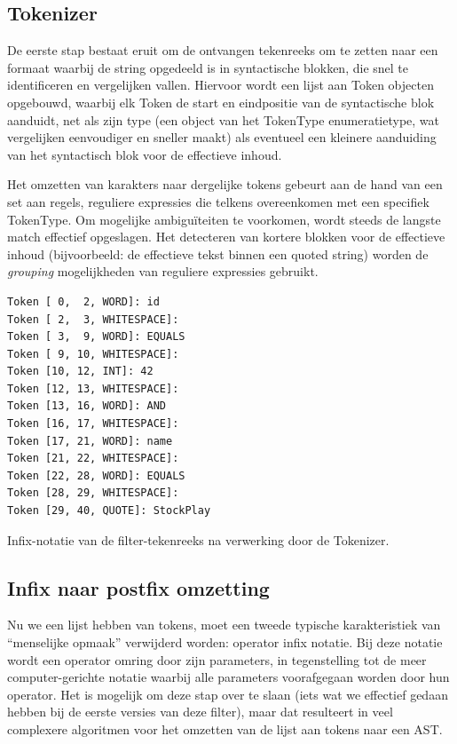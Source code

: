 \subsection{Tokenizer}

De eerste stap bestaat eruit om de ontvangen tekenreeks om te zetten naar een formaat waarbij de string opgedeeld is in syntactische blokken, die snel te identificeren en vergelijken vallen. Hiervoor wordt een lijst aan Token objecten opgebouwd, waarbij elk Token de start en eindpositie van de syntactische blok aanduidt, net als zijn type (een object van het TokenType enumeratietype, wat vergelijken eenvoudiger en sneller maakt) als eventueel een kleinere aanduiding van het syntactisch blok voor de effectieve inhoud.

Het omzetten van karakters naar dergelijke tokens gebeurt aan de hand van een set aan regels, reguliere expressies die telkens overeenkomen met een specifiek TokenType. Om mogelijke ambigu\"iteiten te voorkomen, wordt steeds de langste match effectief opgeslagen. Het detecteren van kortere blokken voor de effectieve inhoud (bijvoorbeeld: de effectieve tekst binnen een quoted string) worden de \emph{grouping} mogelijkheden van reguliere expressies gebruikt.

\begin{code}
\begin{verbatim}
Token [ 0,  2, WORD]: id
Token [ 2,  3, WHITESPACE]:  
Token [ 3,  9, WORD]: EQUALS
Token [ 9, 10, WHITESPACE]:  
Token [10, 12, INT]: 42
Token [12, 13, WHITESPACE]:  
Token [13, 16, WORD]: AND
Token [16, 17, WHITESPACE]:  
Token [17, 21, WORD]: name
Token [21, 22, WHITESPACE]:  
Token [22, 28, WORD]: EQUALS
Token [28, 29, WHITESPACE]:  
Token [29, 40, QUOTE]: StockPlay
\end{verbatim}
\caption{Infix-notatie van de filter-tekenreeks na verwerking door de Tokenizer.}
\end{code}

\subsection{Infix naar postfix omzetting}

Nu we een lijst hebben van tokens, moet een tweede typische karakteristiek van ``menselijke opmaak'' verwijderd worden: operator infix notatie. Bij deze notatie wordt een operator omring door zijn parameters, in tegenstelling tot de meer computer-gerichte notatie waarbij alle parameters voorafgegaan worden door hun operator. Het is mogelijk om deze stap over te slaan (iets wat we effectief gedaan hebben bij de eerste versies van deze filter), maar dat resulteert in veel complexere algoritmen voor het omzetten van de lijst aan tokens naar een AST.

